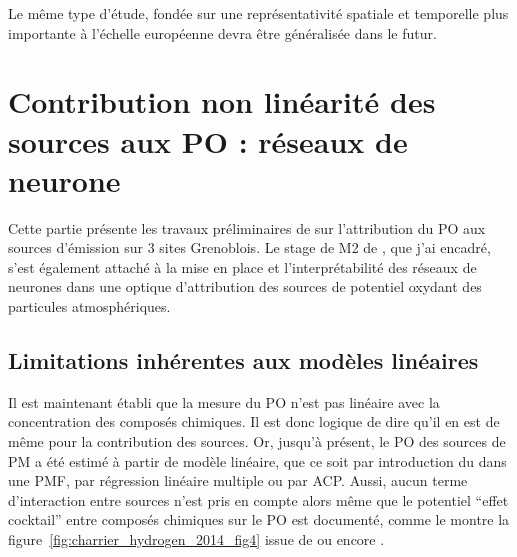 Le même type d'étude, fondée sur une représentativité spatiale et temporelle plus
importante à l'échelle européenne devra être généralisée dans le futur.


\section{Contribution non linéarité des sources aux PO : réseaux de neurone}%
\label{sec:reseau_neurone}

\begin{tcolorbox}[colback=red!5!white,colframe=Melon,title=Note]
    Cette partie présente les travaux préliminaires de \cite{borlazaUrbaninprep.} sur 
    l'attribution du PO aux sources d'émission sur 3 sites Grenoblois. Le stage de M2 de
    \cite{fichesMachine2020}, que j'ai encadré, s'est également attaché à la mise en place et
    l'interprétabilité des réseaux de neurones dans une optique d'attribution des sources
    de potentiel oxydant des particules atmosphériques.
\end{tcolorbox}

\subsection{Limitations inhérentes aux modèles linéaires}%
\label{sub:limitations_inhérentes_aux_modèles_linéaires}


Il est maintenant établi que la mesure du PO n'est pas linéaire avec la concentration des composés
chimiques. Il est donc logique de dire qu'il en est de même pour la contribution des
sources.
Or, jusqu'à présent, le PO des sources de PM a été estimé à partir de modèle linéaire,
que ce soit par introduction du \POv{} dans une PMF, par régression linéaire multiple ou
par ACP.
Aussi, aucun terme d'interaction entre sources n'est pris en compte alors même que
le potentiel ``effet cocktail'' entre composés chimiques sur le PO est documenté, comme le
montre la figure~\ref{fig:charrier_hydrogen_2014_fig4} issue de
\cite{charrierHydrogen2014} ou encore 
\cites[figure S7 du supplément]{charrierDithiothreitol2012}{xiongRethinking2017}{samakeUnexpected2017}{yuSynergistic2018}.

